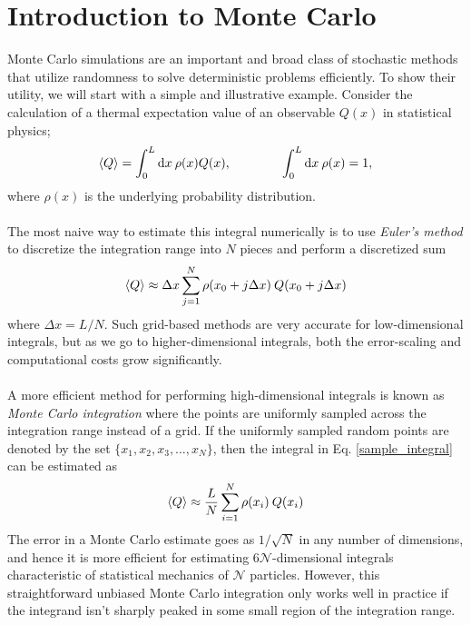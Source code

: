 \documentclass[../journal_main.tex]{subfiles}
\begin{document}
\section{Introduction to Monte Carlo}
Monte Carlo simulations are an important and broad class of stochastic methods that utilize randomness to solve deterministic problems efficiently. To show their utility, we will start with a simple and illustrative example. Consider the calculation of a thermal expectation value of an observable $Q(x)$ in statistical physics;
\begin{equation}
    \expval{Q} = \int_0^L \dd x \: \rho(x) Q(x), \qquad \qquad \int_0^L \dd x \: \rho(x) = 1,
    \label{sample_integral}
\end{equation} 
where $\rho(x)$ is the underlying probability distribution.~\\~\\
The most naive way to estimate this integral numerically is to use \textit{Euler's method}  to discretize the integration range into $N$ pieces and perform a discretized sum
\begin{equation}
    \expval{Q} \approx \Delta x \sum_{j=1}^N \rho(x_0 + j \Delta x) \: Q(x_0 + j\Delta x)
\end{equation} 
where $\Delta x = L/N$. Such grid-based methods are very accurate for low-dimensional integrals, but as we go to higher-dimensional integrals, both the error-scaling and computational costs grow significantly.~\\~\\
A more efficient method for performing high-dimensional integrals is known as \textit{Monte Carlo integration} where the points are uniformly sampled across the integration range instead of a grid. If the uniformly sampled random points are denoted by the set $\{x_1, x_2, x_3, \ldots, x_N \}$, then the integral in Eq. \eqref{sample_integral} can be estimated as 
\begin{equation}
    \expval{Q} \approx \frac{L}{N} \sum_{i=1}^N \rho(x_i) \: Q(x_i)
\end{equation} 
The error in a Monte Carlo estimate goes as $1/\sqrt{N}$ in any number of dimensions, and hence it is more efficient for estimating $6 \mathcal{N}$-dimensional integrals characteristic of statistical mechanics of $\mathcal{N}$ particles. However, this straightforward unbiased Monte Carlo integration only works well in practice if the integrand isn't sharply peaked in some small region of the integration range.
\end{document}
